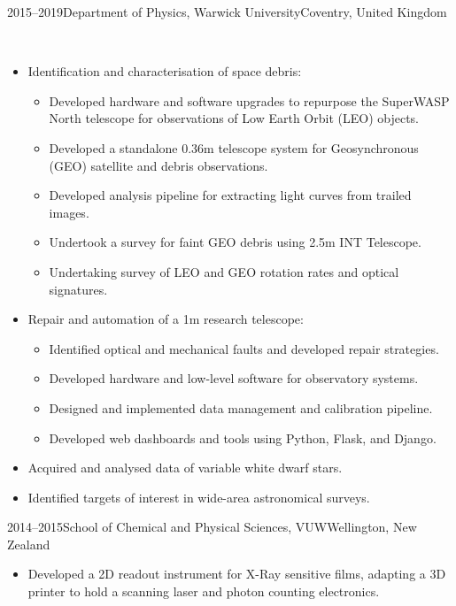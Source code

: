 \documentclass[print]{cv-style}
\begin{document}
\begin{entrylist}
\entry
  {2015--2019}{Department of Physics, Warwick University}{Coventry, United Kingdom}
  {\\
  \vspace{-4.5mm}
  \begin{itemize}
    \item Identification and characterisation of space debris:
	  \begin{itemize}
	    \item Developed hardware and software upgrades to repurpose the SuperWASP North telescope for observations of Low Earth Orbit (LEO) objects.
	    \item Developed a standalone 0.36m telescope system for Geosynchronous (GEO) satellite and debris observations.
	    \item Developed analysis pipeline for extracting light curves from trailed images.
	    \item Undertook a survey for faint GEO debris using 2.5m INT Telescope.
	    \item Undertaking survey of LEO and GEO rotation rates and optical signatures.
	  \end{itemize}
	  \item Repair and automation of a 1m research telescope:
	  \begin{itemize}
	    \item Identified optical and mechanical faults and developed repair strategies.
	    \item Developed hardware and low-level software for observatory systems.
	    \item Designed and implemented data management and calibration pipeline.
	    \item Developed web dashboards and tools using Python, Flask, and Django.
	  \end{itemize}
	  \item Acquired and analysed data of variable white dwarf stars.
	  \item Identified targets of interest in wide-area astronomical surveys.
	\end{itemize}
}
\entry
  {2014--2015}{School of Chemical and Physical Sciences, VUW}{Wellington, New Zealand}
  {
  \begin{itemize}
    \item Developed a 2D readout instrument for X-Ray sensitive films, adapting a 3D printer to hold a scanning laser and photon counting electronics.

\end{itemize}}
\end{entrylist}
\end{document}
